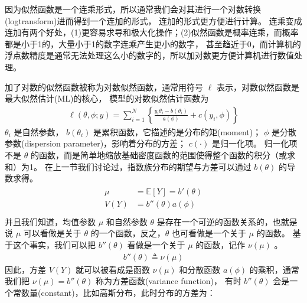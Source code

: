 \documentclass[letterpaper,10pt,english]{sphinxmanual}
\begin{document}
因为似然函数是一个连乘形式，所以通常我们会对其进行一个对数转换(log\sphinxhyphen{}transform)进而得到一个连加的形式，
连加的形式更方便进行计算。
连乘变成连加有两个好处，(1)更容易求导和极大化操作；(2)似然函数是概率连乘，而概率都是小于1的，大量小于1的数字连乘产生更小的数字，
甚至趋近于0，而计算机的浮点数精度是通常无法处理这么小的数字的，所以加对数更方便计算机进行数值处理。

加了对数的似然函数被称为对数似然函数，通常用符号 \(\ell\)
表示，对数似然函数是最大似然估计(ML)的核心，
 模型的对数似然估计函数为
\begin{equation}\label{equation:广义线性模型/estimate:广义线性模型/estimate:0}
\begin{split}\ell(\theta,\phi;y)= \sum_{i=1}^N \left \{   \frac{y_i \theta_i - b(\theta_i)}{a(\phi)}   + c(y_i,\phi)   \right \}\end{split}
\end{equation}
\(\theta_i\) 是自然参数，
\(b(\theta_i)\) 是累积函数，它描述的是分布的矩(moment)；
\(\phi\) 是分散参数(dispersion parameter)，影响着分布的方差；
\(c(\cdot)\) 是归一化项。
归一化项不是 \(\theta\) 的函数，而是简单地缩放基础密度函数的范围使得整个函数的积分（或求和）为1。
在上一节我们讨论过，指数族分布的期望与方差可以通过 \(b(\theta)\) 的导数求得。
\begin{align}\label{equation:广义线性模型/estimate:广义线性模型/estimate:1}\!\begin{aligned}
\mu &= \mathbb{E}[Y] = b'(\theta)\\
V(Y) &= b''(\theta) a(\phi)\\
\end{aligned}\end{align}
并且我们知道，均值参数 \(\mu\) 和自然参数 \(\theta\) 是存在一个可逆的函数关系的，也就是说
\(\mu\) 可以看做是关于 \(\theta\) 的一个函数，反之，\(\theta\) 也可看做是一个关于
\(\mu\) 的函数。
基于这个事实，我们可以把 \(b''(\theta)\) 看做是一个关于 \(\mu\) 的函数，记作
\(\nu(\mu)\) 。
\begin{equation}\label{equation:广义线性模型/estimate:广义线性模型/estimate:2}
\begin{split}b''(\theta) \triangleq \nu(\mu)\end{split}
\end{equation}
因此，方差 \(V(Y)\) 就可以被看成是函数 \(\nu(\mu)\)
和分散函数 \(a(\phi)\) 的乘积，通常我们把 \(\nu(\mu)=b''(\theta)\) 称为方差函数(variance function)，
有时 \(b''(\theta)\) 会是一个常数量(constant)，比如高斯分布，此时分布的方差为：
\end{document}
